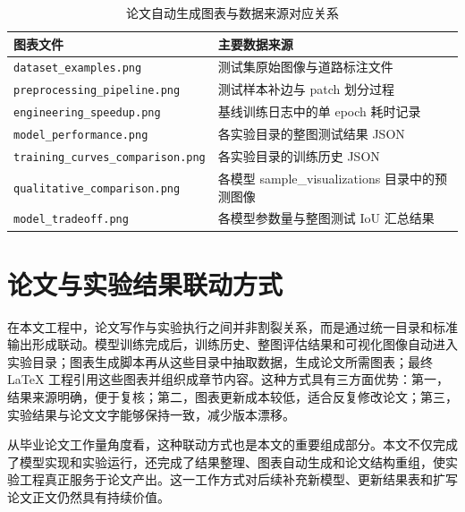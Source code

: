 \begin{table}[htbp]
\centering
\caption{论文自动生成图表与数据来源对应关系}
\label{tab:v2-figure-source}
\begin{tabular}{p{4.0cm}p{8.8cm}}
\toprule
图表文件 & 主要数据来源 \\
\midrule
\texttt{dataset\_examples.png} & 测试集原始图像与道路标注文件 \\
\texttt{preprocessing\_pipeline.png} & 测试样本补边与 patch 划分过程 \\
\texttt{engineering\_speedup.png} & 基线训练日志中的单 epoch 耗时记录 \\
\texttt{model\_performance.png} & 各实验目录的整图测试结果 JSON \\
\texttt{training\_curves\_comparison.png} & 各实验目录的训练历史 JSON \\
\texttt{qualitative\_comparison.png} & 各模型 sample\_visualizations 目录中的预测图像 \\
\texttt{model\_tradeoff.png} & 各模型参数量与整图测试 IoU 汇总结果 \\
\bottomrule
\end{tabular}
\end{table}

\section{论文与实验结果联动方式}
在本文工程中，论文写作与实验执行之间并非割裂关系，而是通过统一目录和标准输出形成联动。模型训练完成后，训练历史、整图评估结果和可视化图像自动进入实验目录；图表生成脚本再从这些目录中抽取数据，生成论文所需图表；最终 \LaTeX{} 工程引用这些图表并组织成章节内容。这种方式具有三方面优势：第一，结果来源明确，便于复核；第二，图表更新成本较低，适合反复修改论文；第三，实验结果与论文文字能够保持一致，减少版本漂移。

从毕业论文工作量角度看，这种联动方式也是本文的重要组成部分。本文不仅完成了模型实现和实验运行，还完成了结果整理、图表自动生成和论文结构重组，使实验工程真正服务于论文产出。这一工作方式对后续补充新模型、更新结果表和扩写论文正文仍然具有持续价值。
